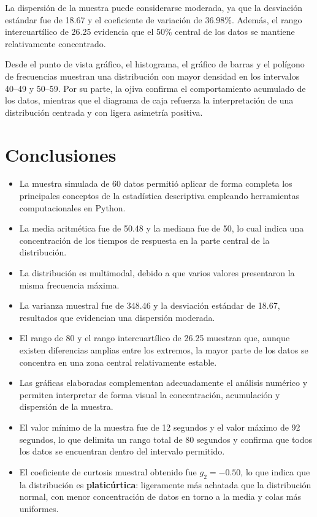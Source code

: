 \documentclass[12pt,letterpaper]{article}
\begin{document}
La dispersión de la muestra puede considerarse moderada, ya que la desviación estándar fue de 18.67 y el coeficiente de variación de 36.98\%. Además, el rango intercuartílico de 26.25 evidencia que el 50\% central de los datos se mantiene relativamente concentrado.

Desde el punto de vista gráfico, el histograma, el gráfico de barras y el polígono de frecuencias muestran una distribución con mayor densidad en los intervalos 40--49 y 50--59. Por su parte, la ojiva confirma el comportamiento acumulado de los datos, mientras que el diagrama de caja refuerza la interpretación de una distribución centrada y con ligera asimetría positiva.

\section{Conclusiones}

\begin{itemize}[leftmargin=1.2cm]
    \item La muestra simulada de 60 datos permitió aplicar de forma completa los principales conceptos de la estadística descriptiva empleando herramientas computacionales en Python.
    \item La media aritmética fue de 50.48 y la mediana fue de 50, lo cual indica una concentración de los tiempos de respuesta en la parte central de la distribución.
    \item La distribución es multimodal, debido a que varios valores presentaron la misma frecuencia máxima.
    \item La varianza muestral fue de 348.46 y la desviación estándar de 18.67, resultados que evidencian una dispersión moderada.
    \item El rango de 80 y el rango intercuartílico de 26.25 muestran que, aunque existen diferencias amplias entre los extremos, la mayor parte de los datos se concentra en una zona central relativamente estable.
    \item Las gráficas elaboradas complementan adecuadamente el análisis numérico y permiten interpretar de forma visual la concentración, acumulación y dispersión de la muestra.
    \item El valor mínimo de la muestra fue de 12 segundos y el valor máximo de 92 segundos, lo que delimita un rango total de 80 segundos y confirma que todos los datos se encuentran dentro del intervalo permitido.
    \item El coeficiente de curtosis muestral obtenido fue $g_2 = -0.50$, lo que indica que la distribución es \textbf{platicúrtica}: ligeramente más achatada que la distribución normal, con menor concentración de datos en torno a la media y colas más uniformes.
\end{itemize}
\end{document}
